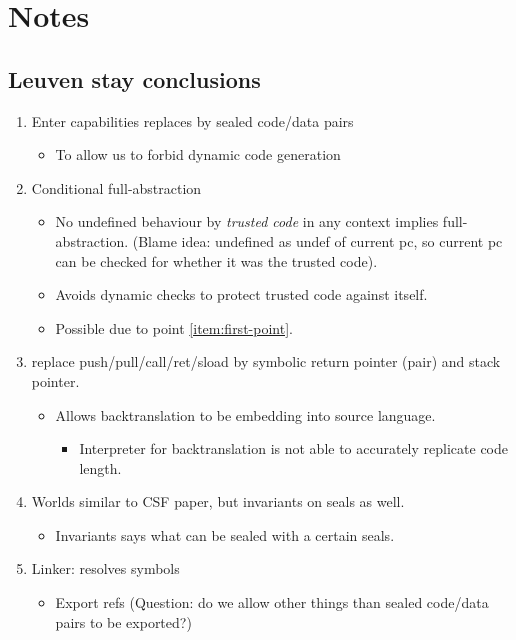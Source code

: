 \documentclass[a4paper]{article}
\begin{document}
\section{Notes}
\subsection{Leuven stay conclusions}
\begin{enumerate}
\item Enter capabilities replaces by sealed code/data pairs \label{item:first-point}
  \begin{itemize}
  \item To allow us to forbid dynamic code generation
  \end{itemize}
\item Conditional full-abstraction
  \begin{itemize}
  \item No undefined behaviour by \emph{trusted code} in any context implies full-abstraction. (Blame idea: undefined as undef of current pc, so current pc can be checked for whether it was the trusted code).
  \item Avoids dynamic checks to protect trusted code against itself.
  \item Possible due to point \ref{item:first-point}.
  \end{itemize}
\item replace push/pull/call/ret/sload by symbolic return pointer (pair) and stack pointer.
  \begin{itemize}
  \item Allows backtranslation to be embedding into source language.
    \begin{itemize}
    \item Interpreter for backtranslation is not able to accurately replicate code length.
    \end{itemize}
  \end{itemize}
\item Worlds similar to CSF paper, but invariants on seals as well.
  \begin{itemize}
  \item Invariants says what can be sealed with a certain seals.
  \end{itemize}
\item Linker: resolves symbols
  \begin{itemize}
  \item Export refs (Question: do we allow other things than sealed code/data pairs to be exported?)

\end{itemize}
\end{enumerate}
\end{document}
